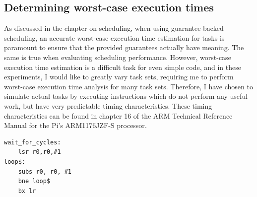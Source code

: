 \subsection{Determining worst-case execution times}
As discussed in the chapter on scheduling, when using guarantee-backed scheduling, an accurate worst-case execution time estimation for tasks is paramount to ensure that the provided guarantees actually have meaning. The same is true when evaluating scheduling performance. However, worst-case execution time estimation is a difficult task for even simple code, and in these experiments, I would like to greatly vary task sets, requiring me to perform worst-case execution time analysis for many task sets. Therefore, I have chosen to simulate actual tasks by executing instructions which do not perform any useful work, but have very predictable timing characteristics. These timing characteristics can be found in chapter 16 of the ARM Technical Reference Manual for the Pi's ARM1176JZF-S processor\cite{arm:arm1176}.\\


\begin{lstlisting}
wait_for_cycles:
    lsr r0,r0,#1
loop$:
    subs r0, r0, #1
    bne loop$
    bx lr
\end{lstlisting}

